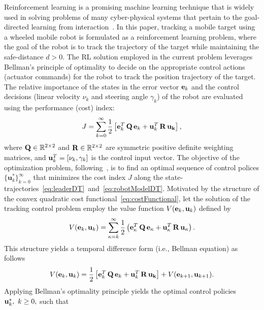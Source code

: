 \documentclass[conference]{IEEEtran}
\begin{document}
 
 Reinforcement learning is a promising  machine learning technique that is widely used in solving problems of many cyber-physical systems that pertain to the goal-directed learning from interaction~\cite{sutton2020reinforcement}. In this paper, tracking a mobile target using a wheeled mobile robot is formulated as a reinforcement learning problem, where the goal of the robot is to track the trajectory of the target while maintaining the safe-distance $d>0.$ The RL solution employed in the current problem leverages Bellman's principle of optimality to decide on the appropriate control actions (actuator commands) for the robot to track the position trajectory of the target. The relative importance of the states in the error vector ${\bf e}_k$ and the control decisions (linear velocity $\nu_k$ and steering angle $\gamma_k$) of the robot are evaluated using the  performance (cost) index: %
 \begin{align}
 \label{eq:costFunctional}
 J = \sum_{k=0}^\infty \frac{1}{2}\left[{\bf e}_k^T \, {\bf Q} \, {\bf e}_k + {\bf u}_k^T \, {\bf R} \, {\bf u_k}\right],
 \end{align}    
 where ${\bf Q}\in\mathbb{R}^{2\times 2}$ and ${\bf R}\in\mathbb{R}^{2\times 2}$ are symmetric positive definite weighting matrices, and ${\bf u}_k^T = [\nu_k,\gamma_k]$ is the control input vector.  The objective of the optimization problem, following~\cite{Lewis2013-Reinforcement}, is to find an optimal sequence of control polices $\{\mathbf{u}^*_k\}_{k=0}^\infty$ that minimizes the cost index $J$ along the state-trajectories~\eqref{eq:leaderDT}~and~\eqref{eq:robotModelDT}. Motivated by the structure of the convex quadratic cost functional~\eqref{eq:costFunctional}, let the solution of the tracking control problem employ the value function $V({\bf e}_k,{\bf u}_k)$ defined by %
 \begin{equation*}
 \label{eq:valueFunction}
 V({\bf e}_k,{\bf u}_k) = \sum_{\kappa=k}^\infty \frac{1}{2}\left({\bf e}_\kappa^T\, {\bf Q}\, {\bf e}_\kappa + {\bf u}_\kappa^T \, {\bf R}\, {\bf u_\kappa}\right).
 \end{equation*}
 This structure yields a temporal difference form (i.e., Bellman equation) as follows
 \begin{equation*}
 \label{eq:tempraldiffeq}
 V({\bf e}_k,{\bf u}_k)= \frac{1}{2}\left[{\bf e}_k^T\, {\bf Q}\, {\bf e}_k + {\bf u}_k^T\, {\bf R}\, {\bf u_k}\right] +V({\bf e}_{k+1},{\bf u}_{k+1}).
 \end{equation*}
 Applying Bellman's optimality principle yields the optimal control policies ${\bf u}_k^*,~k\ge 0,$ such that~\cite{Lewis2012} %
\end{document}
